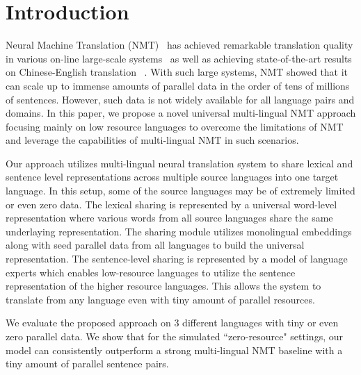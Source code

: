 \section{Introduction}
Neural Machine Translation (NMT)~\cite{bahdanau2014neural} has achieved remarkable  translation quality in various  on-line large-scale systems~\cite{wu2016google,devlin:2017:EMNLP2017} as well as achieving  state-of-the-art results on Chinese-English  translation ~\cite{hassan-hp}. With such large systems, NMT showed that it can scale up to immense  amounts of parallel data in the order of tens of millions of sentences. However, such data is not widely available for all language pairs and  domains. In this paper, we propose a novel universal multi-lingual NMT approach   focusing mainly on low resource languages to overcome the  limitations of NMT and leverage the capabilities of multi-lingual NMT  in such scenarios.

Our approach utilizes multi-lingual neural translation system to share lexical and sentence level representations across multiple source languages into one target language. In this setup, some of the source languages may be of extremely limited  or even zero data.  The lexical sharing is represented by a  universal word-level representation where various words from all source languages  share the same underlaying representation. The sharing module utilizes monolingual embeddings along with seed parallel data from all languages to build the universal representation. The sentence-level sharing is represented by a model of language experts which  enables low-resource  languages to  utilize the sentence representation of the higher resource languages.  This allows the system to translate from any language even with tiny amount of parallel resources.  %

We evaluate the proposed approach on 3 different  languages with tiny or even zero parallel data.
We show that for the simulated ``zero-resource" settings, our model can consistently outperform a strong multi-lingual NMT baseline with a tiny amount of parallel sentence pairs.


